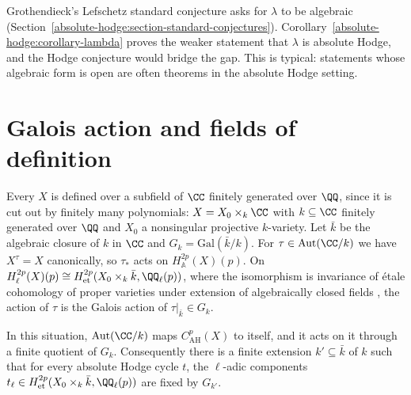 \begin{remark}\label{absolute-hodge:remark-lefschetz-standard}
Grothendieck's Lefschetz standard conjecture asks for $\lambda$ to be algebraic (Section~\ref{absolute-hodge:section-standard-conjectures}). Corollary~\ref{absolute-hodge:corollary-lambda} proves the weaker statement that $\lambda$ is absolute
Hodge, and the Hodge conjecture would bridge the gap. This is typical: statements whose algebraic form is open are often theorems in the absolute Hodge setting.
\end{remark}

\section{Galois action and fields of definition}\label{absolute-hodge:section-galois}

Every $X$ is defined over a subfield of $\CC$ finitely generated over $\QQ$, since it is cut out by finitely many polynomials: $X = X_0 \times_k\CC$ with $k \subseteq \CC$ finitely generated over $\QQ$ and $X_0$ a
nonsingular projective $k$-variety. Let $\bar k$ be the algebraic closure of $k$ in $\CC$ and $G_k = \mathrm{Gal}(\bar k/k)$. For $\tau \in \mathrm{Aut}(\CC/k)$ we have $X^\tau = X$ canonically, so $\tau_*$ acts on
$H^{2p}_{\mathbb{A}}(X)(p)$. On $H^{2p}_\ell(X)(p) \cong H^{2p}_{\mathrm{et}}(X_0 \times_k\bar k, \QQ_\ell(p))$, where the isomorphism is invariance of \'etale cohomology of proper varieties under extension of
algebraically closed fields \cite[Chapter VI]{milne-etale}, the action of $\tau$ is the Galois action of $\tau|_{\bar k} \in G_k$.

\begin{proposition}\label{absolute-hodge:proposition-galois-finite}
In this situation, $\mathrm{Aut}(\CC/k)$ maps $C^p_{\mathrm{AH}}(X)$ to itself, and it acts on it through a finite quotient of $G_k$. Consequently there is a finite extension $k' \subseteq \bar k$ of $k$ such that
for every absolute Hodge cycle $t$, the $\ell$-adic components $t_\ell \in H^{2p}_{\mathrm{et}}(X_0 \times_k\bar k, \QQ_\ell(p))$ are fixed by $G_{k'}$.
\end{proposition}

